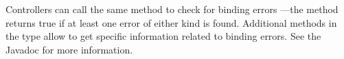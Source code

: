 Controllers can call the same  method to check for binding errors
---the method returns true if at least one error of either kind is found.
Additional methods in the  type allow to get specific 
information related to binding errors. See the Javadoc for more information.
